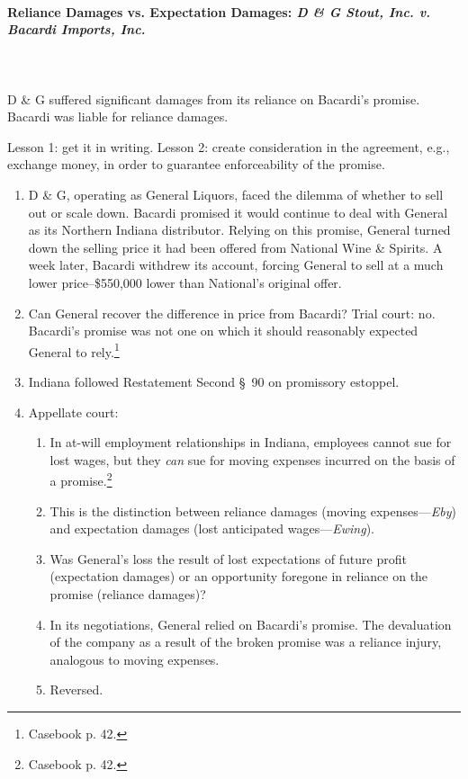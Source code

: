\paragraph{Reliance Damages vs. Expectation Damages: \emph{D \& G Stout, 
Inc. v. Bacardi Imports, Inc.}}
~\\\\
D \& G suffered significant damages from its reliance on Bacardi's promise. 
Bacardi was liable for reliance damages.

Lesson 1: get it in writing. Lesson 2: create consideration in the agreement, 
e.g., exchange money, in order to guarantee enforceability of the promise.

\begin{enumerate}
    \item D \& G, operating as General Liquors, faced the dilemma of whether 
    to sell out or scale down. Bacardi promised it would continue to deal with 
    General as its Northern Indiana distributor. Relying on this promise, 
    General turned down the selling price it had been offered from National 
    Wine \& Spirits. A week later, Bacardi withdrew its account, forcing 
    General to sell at a much lower price--\$550,000 lower than National's 
    original offer.
    \item Can General recover the difference in price from Bacardi? Trial 
    court: no. Bacardi's promise was not one on which it should reasonably 
    expected General to rely.\footnote{Casebook p. 42.}
    \item Indiana followed Restatement Second \S\ 90 on promissory estoppel.
    \item Appellate court:
    \begin{enumerate}
        \item In at-will employment relationships in Indiana, employees cannot 
        sue for lost wages, but they \emph{can} sue for moving expenses 
        incurred on the basis of a promise.\footnote{Casebook p. 42.}
        \item This is the distinction between reliance damages (moving 
        expenses---\emph{Eby}) and expectation damages (lost anticipated 
        wages---\emph{Ewing}).
        \item Was General's loss the result of lost expectations of future 
        profit (expectation damages) or an opportunity foregone in reliance on 
        the promise (reliance damages)?
        \item In its negotiations, General relied on Bacardi's promise. The 
        devaluation of the company as a result of the broken promise was a 
        reliance injury, analogous to moving expenses.
        \item Reversed.
    \end{enumerate}
\end{enumerate}


